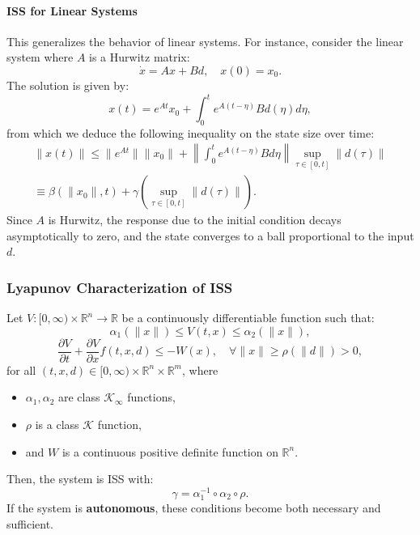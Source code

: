\paragraph{ISS for Linear Systems}
This generalizes the behavior of linear systems. For instance, consider the linear system where $A$ is a Hurwitz matrix:
\noindent\begin{equation*}
    \dot{x} = A x + B d, \quad x(0) = x_0.
\end{equation*}
The solution is given by:
\noindent\begin{equation*}
    x(t) = e^{A t} x_0 + \int_0^t e^{A (t - \eta)} B d(\eta) d\eta,
\end{equation*}
from which we deduce the following inequality on the state size over time:
\noindent\begin{gather*}
    \|x(t)\| \leq \| e^{A t} \| \|x_0\| + \left\| \int_0^t e^{A (t - \eta)} B d\eta \right\| \sup_{\tau \in [0, t]} \|d(\tau)\| \\
    \equiv \beta(\|x_0\|, t) + \gamma \left( \sup_{\tau \in [0, t]} \|d(\tau)\| \right).
\end{gather*}
Since $A$ is Hurwitz, the response due to the initial condition decays asymptotically to zero, and the state converges to a ball proportional to the input $d$.

\subsubsection{Lyapunov Characterization of ISS}
Let $V : [0, \infty) \times \mathbb{R}^n \to \mathbb{R}$ be a continuously differentiable function such that:   %
\noindent\begin{equation*}
    \alpha_1(\|x\|) \leq V(t, x) \leq \alpha_2(\|x\|),
\end{equation*}
\noindent\begin{equation*}
    \frac{\partial V}{\partial t} + \frac{\partial V}{\partial x} f(t, x, d) \leq -W(x), \quad \forall \|x\| \geq \rho(\|d\|) > 0,
\end{equation*}
for all $(t, x, d) \in [0, \infty) \times \mathbb{R}^n \times \mathbb{R}^m$, where   %
\begin{itemize}
    \item $\alpha_1, \alpha_2$ are class $\mathcal{K}_\infty$ functions,
    \item $\rho$ is a class $\mathcal{K}$ function,
    \item and $W$ is a continuous positive definite function on $\mathbb{R}^n$.
\end{itemize}
Then, the system is ISS with:
\noindent\begin{equation*}
    \gamma = \alpha_1^{-1} \circ \alpha_2 \circ \rho.
\end{equation*}
If the system is \textbf{autonomous}, these conditions become both necessary and sufficient.

